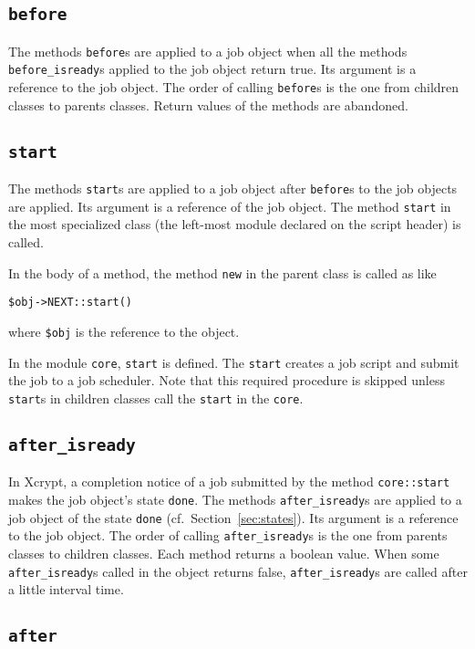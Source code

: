 \documentclass[a4paper,10pt]{report}
\def\|{\verb|} %|
\begin{document}
\subsection{\texttt{before}}

The methods \texttt{before}s are applied to a job object when all the
methods \texttt{before\_isready}s applied to the job object return
true.  Its argument is a reference to the job object.  The order of calling
\texttt{before}s is the one from children classes to parents
classes.  Return values of the methods are abandoned.

\subsection{\texttt{start}}

The methods \texttt{start}s are applied to a job object after
\texttt{before}s to the job objects are applied.  Its argument is a
reference of the job object.  The method \|start| in the most
specialized class (the left-most module declared on the script header)
is called.

In the body of a method, the method \|new| in the parent class is
called as like
\begin{center}
 \|$obj->NEXT::start()|
\end{center}
where \|$obj| is the reference to the object.

In the module \|core|, \|start| is defined.  The \|start| creates a
job script and submit the job to a job scheduler.  Note that this
required procedure is skipped unless \|start|s in children classes call
the \|start| in the \|core|.

\subsection{\texttt{after\_isready}}

In Xcrypt, a completion notice of a job submitted by the method
 \|core::start| makes the job object's state \|done|.  The methods
 \texttt{after\_isready}s are applied to a job object of the state
 \|done| (cf.\ Section~\ref{sec:states}).  Its argument is a reference
 to the job object.  The order of calling \texttt{after\_isready}s is
 the one from parents classes to children classes.  Each method
 returns a boolean value.  When some \texttt{after\_isready}s called
 in the object returns false, \texttt{after\_isready}s are called
 after a little interval time.

\subsection{\texttt{after}}
\end{document}

